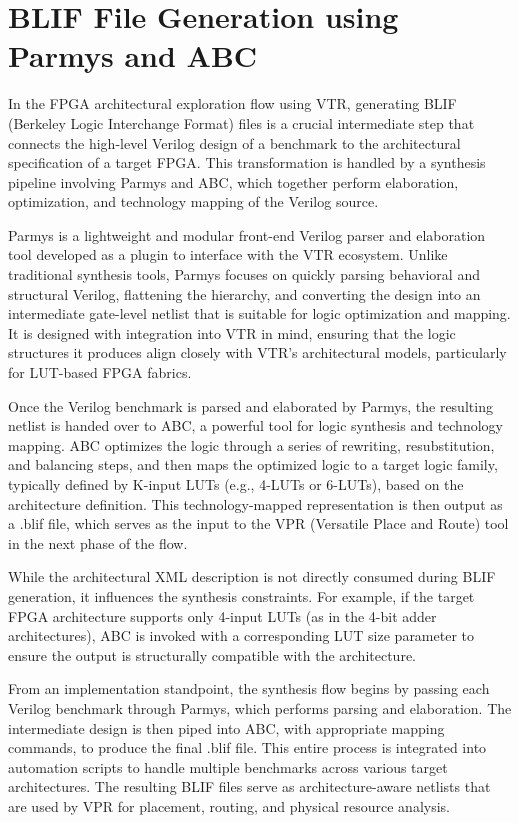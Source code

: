 \section{BLIF File Generation using Parmys and ABC}
In the FPGA architectural exploration flow using VTR, generating BLIF (Berkeley Logic Interchange Format) files is a crucial intermediate step that connects the high-level Verilog design of a benchmark to the architectural specification of a target FPGA. This transformation is handled by a synthesis pipeline involving Parmys and ABC, which together perform elaboration, optimization, and technology mapping of the Verilog source.

Parmys is a lightweight and modular front-end Verilog parser and elaboration tool developed as a plugin to interface with the VTR ecosystem. Unlike traditional synthesis tools, Parmys focuses on quickly parsing behavioral and structural Verilog, flattening the hierarchy, and converting the design into an intermediate gate-level netlist that is suitable for logic optimization and mapping. It is designed with integration into VTR in mind, ensuring that the logic structures it produces align closely with VTR's architectural models, particularly for LUT-based FPGA fabrics.

Once the Verilog benchmark is parsed and elaborated by Parmys, the resulting netlist is handed over to ABC, a powerful tool for logic synthesis and technology mapping. ABC optimizes the logic through a series of rewriting, resubstitution, and balancing steps, and then maps the optimized logic to a target logic family, typically defined by K-input LUTs (e.g., 4-LUTs or 6-LUTs), based on the architecture definition. This technology-mapped representation is then output as a .blif file, which serves as the input to the VPR (Versatile Place and Route) tool in the next phase of the flow.

While the architectural XML description is not directly consumed during BLIF generation, it influences the synthesis constraints. For example, if the target FPGA architecture supports only 4-input LUTs (as in the 4-bit adder architectures), ABC is invoked with a corresponding LUT size parameter to ensure the output is structurally compatible with the architecture.

From an implementation standpoint, the synthesis flow begins by passing each Verilog benchmark through Parmys, which performs parsing and elaboration. The intermediate design is then piped into ABC, with appropriate mapping commands, to produce the final .blif file. This entire process is integrated into automation scripts to handle multiple benchmarks across various target architectures. The resulting BLIF files serve as architecture-aware netlists that are used by VPR for placement, routing, and physical resource analysis.

